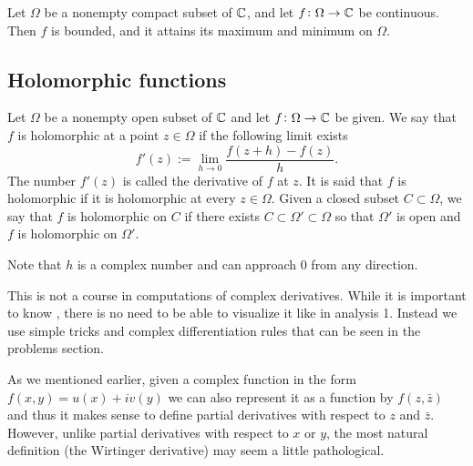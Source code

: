 \documentclass[11pt,a4paper]{article}
\begin{document}
\begin{proposition}
  Let $\Omega$ be a nonempty compact subset of $\mathbb{C}$, and let 
  $f \colon \Omega \to \mathbb{C}$ be continuous.
  Then $f$ is bounded, and it attains its maximum and minimum on $\Omega$.
\end{proposition}

\subsection{Holomorphic functions}

\begin{definition}
  \label{def:holomorphic-function}
  Let $\Omega$ be a nonempty open subset of $\mathbb{C}$ and let 
  $f \colon \Omega \to \mathbb{C}$ be given.
  We say that $f$ is holomorphic at a point $z \in \Omega$
  if the following limit exists
  \[
      f'(z) := \lim_{h \to 0} \frac{f(z + h) - f(z)}{h}.
  \]
  The number $f'(z)$ is called the derivative of $f$ at $z$.
  It is said that $f$ is holomorphic if it is holomorphic at every
  $z \in \Omega$.
  Given a closed subset $C \subset \Omega$, we say that $f$ is holomorphic
  on $C$ if there exists $C \subset \Omega' \subset \Omega$ so that
  $\Omega'$ is open and $f$ is holomorphic on $\Omega'$.
\end{definition}

\begin{remark}
  Note that $h$ is a complex number and can approach $0$ from any direction.
\end{remark}

\begin{remark}
  This is not a course in computations of complex derivatives.
  While it is important to know ,
  there is no need to be able to visualize it like in analysis 1.
  Instead we use simple tricks and complex differentiation rules
  that can be seen in the problems section.
\end{remark}

\begin{remark}
  As we mentioned earlier, given a complex function in the form
  $f(x,y) = u(x) + i v(y)$ we can also represent it as a function
  by $f(z, \bar z)$ and thus it makes sense to define partial derivatives
  with respect to $z$ and $\bar z$.
  However, unlike partial derivatives with respect to $x$ or $y$,
  the most natural definition (the Wirtinger derivative) may seem a little
  pathological.
\end{remark}
\end{document}
